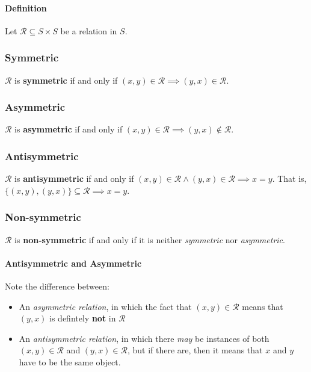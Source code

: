 \paragraph{Definition}

Let $\mathcal{R} \subseteq S \times S$ be a relation in $S$.

\subsubsection{Symmetric}

$\mathcal{R}$ is \textbf{symmetric} if and only if
$(x, y) \in \mathcal{R} \implies (y, x) \in \mathcal{R}$.

\subsubsection{Asymmetric}

$\mathcal{R}$ is \textbf{asymmetric} if and only if
$(x, y) \in \mathcal{R} \implies (y, x) \notin \mathcal{R}$.

\subsubsection{Antisymmetric}

$\mathcal{R}$ is \textbf{antisymmetric} if and only if
$ (x,y) \in \mathcal{R} \land (y, x) \in \mathcal{R} \implies x = y $.
That is, $\{(x, y), (y, x) \} \subseteq \mathcal{R} \implies x = y $.

\subsubsection{Non-symmetric}

$\mathcal{R}$ is \textbf{non-symmetric} if and only if it is neither
\textit{symmetric} nor \textit{asymmetric}.

\paragraph{Antisymmetric and Asymmetric}

Note the difference between:
\begin{itemize}
\item An \textit{asymmetric relation}, in which the fact that
  $(x, y) \in \mathcal{R}$ means that $(y, x)$ is defintely
  \textbf{not} in $\mathcal{R}$
\item An \textit{antisymmetric relation}, in which there \textit{may}
  be instances of both $(x, y) \in \mathcal{R}$ and
  $(y, x) \in \mathcal{R}$, but if there are, then it means that $x$
  and $y$ have to be the same object.
\end{itemize}


